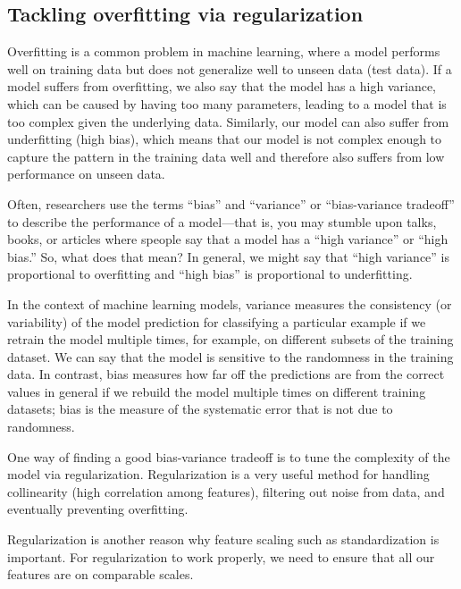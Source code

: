 \subsection{Tackling overfitting via regularization}
Overfitting is a common problem in machine learning, where a model performs well on training data but does not generalize well to unseen data (test data). If a model suffers from overfitting, we also say that the model has a high variance, which can be caused by having too many parameters, leading to a model that is too complex given the underlying data. Similarly, our model can also suffer from underfitting (high bias), which means that our model is not complex enough to capture the pattern in the training data well and therefore also suffers from low performance on unseen data.

\begin{tcolorbox}[title=The bias-variance tradeoff]
    Often, researchers use the terms “bias” and “variance” or “bias-variance tradeoff” to describe the performance of a model—that is, you may stumble upon talks, books, or articles where speople say that a model has a “high variance” or “high bias.” So, what does that mean? In general, we might say that “high variance” is proportional to overfitting and “high bias” is proportional to underfitting.

    In the context of machine learning models, variance measures the consistency (or variability) of the model prediction for classifying a particular example if we retrain the model multiple times, for example, on different subsets of the training dataset. We can say that the model is sensitive to the randomness in the training data. In contrast, bias measures how far off the predictions are from the correct values in general if we rebuild the model multiple times on different training datasets; bias is the measure of the systematic error that is not due to randomness.
\end{tcolorbox}

One way of finding a good bias-variance tradeoff is to tune the complexity of the model via regularization. Regularization is a very useful method for handling collinearity (high correlation among features), filtering out noise from data, and eventually preventing overfitting.

\begin{tcolorbox}[title=Regularization and feature normalization]
    Regularization is another reason why feature scaling such as standardization is important. For regularization to work properly, we need to ensure that all our features are on comparable scales.
\end{tcolorbox}

